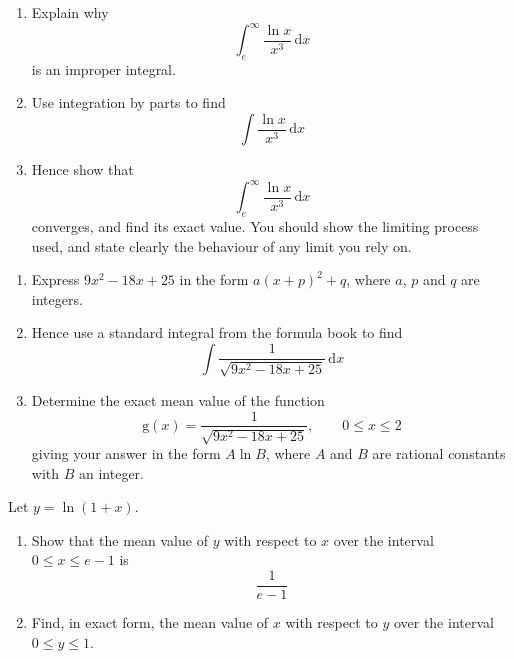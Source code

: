 \documentclass[leqno]{article}
\begin{document}
\begin{enumerate}[
  label=\textbf{\arabic*.},
  leftmargin=*,
  topsep=0pt,
  partopsep=0pt,
  parsep=0pt
]
\newpage

\questionitem

\begin{enumerate}[label=\textbf{(\alph*)}]
  \item Explain why
  \[\int_{e}^{\infty} \dfrac{\ln x}{x^{3}}\,\mathrm{d}x\]
  is an improper integral.  \\
  \item Use integration by parts to find
  \[\int \dfrac{\ln x}{x^{3}}\,\mathrm{d}x\] 
  \item Hence show that
  \[\int_{e}^{\infty} \dfrac{\ln x}{x^{3}}\,\mathrm{d}x\]
  converges, and find its exact value. You should show the limiting process used, and state clearly the behaviour of any limit you rely on.  \\
\end{enumerate}

\newpage

\questionitem

\begin{enumerate}[label=\textbf{(\alph*)}]
  \item Express $9x^2 - 18x + 25$ in the form $a(x+p)^2 + q$, where $a$, $p$ and $q$ are integers.  \\
  \item Hence use a standard integral from the formula book to find
  \[\int \dfrac{1}{\sqrt{9x^2 - 18x + 25}}\,\mathrm{d}x\] 
  \item Determine the exact mean value of the function
  \[\mathrm{g}(x) = \dfrac{1}{\sqrt{9x^2 - 18x + 25}}, \qquad 0 \le x \le 2\]
  giving your answer in the form $A \ln B$, where $A$ and $B$ are rational constants with $B$ an integer.  \\
\end{enumerate}

\newpage

\questionitem

Let $y = \ln(1 + x)$. \\
\begin{enumerate}[label=\textbf{(\alph*)}]
  \item Show that the mean value of $y$ with respect to $x$ over the interval $0 \le x \le e - 1$ is
  \[\dfrac{1}{e - 1}\] 
  \item Find, in exact form, the mean value of $x$ with respect to $y$ over the interval $0 \le y \le 1$.  \\
\end{enumerate}


\end{enumerate}
\end{document}
